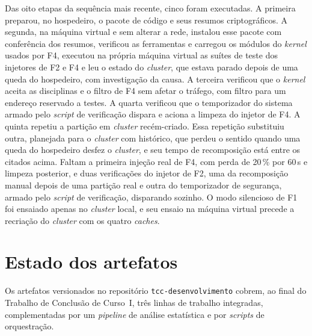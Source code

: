 Das oito etapas da sequência mais recente, cinco foram executadas. A primeira preparou, no hospedeiro, o pacote de código e seus resumos criptográficos. A segunda, na máquina virtual e sem alterar a rede, instalou esse pacote com conferência dos resumos, verificou as ferramentas e carregou os módulos do \emph{kernel} usados por F4, executou na própria máquina virtual as suítes de teste dos injetores de F2 e F4 e leu o estado do \emph{cluster}, que estava parado depois de uma queda do hospedeiro, com investigação da causa. A terceira verificou que o \emph{kernel} aceita as disciplinas e o filtro de F4 sem afetar o tráfego, com filtro para um endereço reservado a testes. A quarta verificou que o temporizador do sistema armado pelo \emph{script} de verificação dispara e aciona a limpeza do injetor de F4. A quinta repetiu a partição em \emph{cluster} recém-criado. Essa repetição substituiu outra, planejada para o \emph{cluster} com histórico, que perdeu o sentido quando uma queda do hospedeiro desfez o \emph{cluster}, e seu tempo de recomposição está entre os citados acima. Faltam a primeira injeção real de F4, com perda de 20\,\% por 60\,s e limpeza posterior, e duas verificações do injetor de F2, uma da recomposição manual depois de uma partição real e outra do temporizador de segurança, armado pelo \emph{script} de verificação, disparando sozinho. O modo silencioso de F1 foi ensaiado apenas no \emph{cluster} local, e seu ensaio na máquina virtual precede a recriação do \emph{cluster} com os quatro \emph{caches}.

\section{Estado dos artefatos}
\label{sec-estado-artefatos}

Os artefatos versionados no repositório \texttt{tcc-desenvolvimento} cobrem, ao final do Trabalho de Conclusão de Curso~I, três linhas de trabalho integradas, complementadas por um \emph{pipeline} de análise estatística e por \emph{scripts} de orquestração.

